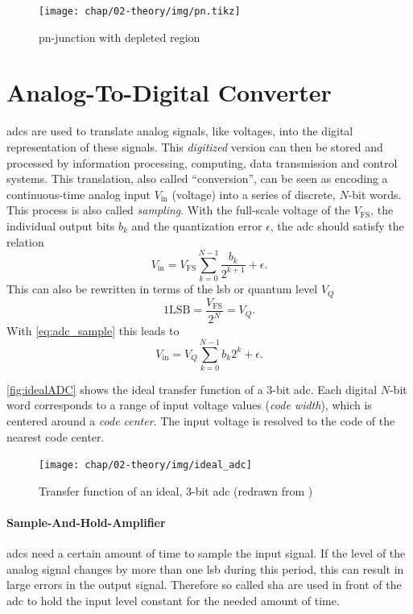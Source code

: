 \begin{figure}[tbh]
	\centering
	\texttt{[image: chap/02-theory/img/pn.tikz]}
	\caption{pn-junction with depleted region \cite{pn-junc}}
	\label{fig:pn_junc}
\end{figure}


\section{Analog-To-Digital Converter}
\Glspl{adc} are used to translate analog signals, like voltages, into the digital representation of these signals.
This \textit{digitized} version can then be stored and processed by information processing, computing, data transmission and control systems. 
This translation, also called ``conversion'', can be seen as encoding a continuous-time analog input $V_\text{in}$ (voltage) into a series of discrete, $N$-bit words. %
This process is also called \textit{sampling}. 
With the full-scale voltage of the $V_{\text{FS}}$, the individual output bits $b_k$ and the quantization error $\epsilon$, the \gls{adc} should satisfy the relation
\begin{equation} \label{eq:adc_sample}
	V_{\text{in}} = V_{\text{FS}} \sum_{k = 0}^{N-1} \frac{b_k}{2^{k+1}} + \epsilon.
\end{equation}
This can also be rewritten in terms of the \gls{lsb} or quantum level $V_Q$
\begin{equation}
	1 \text{LSB} = \frac{V_\text{FS}}{2^N} = V_Q.
\end{equation}
With \autoref{eq:adc_sample} this leads to 
\begin{equation}
	V_\text{in} = V_Q \sum_{k = 0}^{N-1} b_k 2^{k}  + \epsilon.
\end{equation}

\autoref{fig:idealADC} shows the ideal transfer function of a 3-bit \gls{adc}. 
Each digital $N$-bit word corresponds to a range of input voltage values (\textit{code width}), which is centered around a \textit{code center}.
The input voltage is resolved to the code of the nearest code center.
\begin{figure}[H]
	\centering
	\texttt{[image: chap/02-theory/img/ideal\_adc]}
	\caption[Transfer function of ideal, 3-bit ADC]{Transfer function of an ideal, 3-bit \gls{adc} (redrawn from \cite{Lundberg})}
	\label{fig:idealADC}
\end{figure}


\paragraph{Sample-And-Hold-Amplifier}
\Glspl{adc} need a certain amount of time to sample the input signal.
If the level of the analog signal changes by more than one \gls{lsb} during this period, this can result in large errors in the output signal.
Therefore so called \gls{sha} are used in front of the \gls{adc} to hold the input level constant for the needed amount of time.

